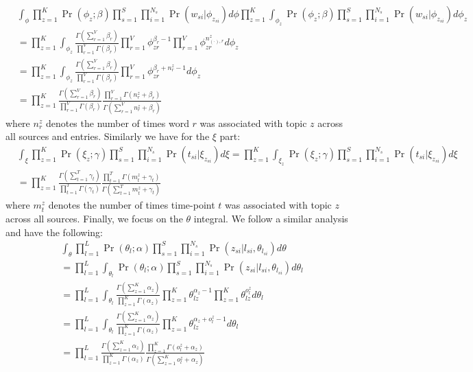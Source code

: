 \documentclass{sig-alternate}
\begin{document}
{\scriptsize
\begin{align}
& \int_{\phi} \prod_{z = 1}^{K}\Pr(\phi_z;\beta) \prod_{s = 1}^{S}\prod_{i = 1}^{N_s}\Pr(w_{si}|\phi_{z_{si}}) d\phi  \prod_{z = 1}^{K} \int_{\phi_{z}} \Pr(\phi_z;\beta) \prod_{s = 1}^{S}\prod_{i = 1}^{N_s}\Pr(w_{si}|\phi_{z_{si}}) d\phi_{z} \nonumber \\
&= \prod_{z = 1}^{K} \int_{\phi_z} \frac{\Gamma(\sum_{r = 1}^V \beta_r)}{\prod_{r = 1}^V \Gamma(\beta_r)}\prod_{r = 1}^V \phi_{zr}^{\beta_r -1} \prod_{r = 1}^V \phi_{zr}^{n^{z}_{(\cdot),r}} d\phi_z \nonumber \\
&= \prod_{z = 1}^{K} \int_{\phi_z} \frac{\Gamma(\sum_{r = 1}^V \beta_r)}{\prod_{r = 1}^V \Gamma(\beta_r)}\prod_{r = 1}^V \phi_{zr}^{\beta_r  + n^{z}_{r} -1} d\phi_z \nonumber \\
& = \prod_{z = 1}^K \frac{\Gamma(\sum_{r = 1}^V \beta_r)}{\prod_{r = 1}^V \Gamma(\beta_r)} \frac{\prod_{r = 1}^V \Gamma(n^{z}_{r} + \beta_r)}{\Gamma(\sum_{r =1}^V n^{z}_{r} + \beta_r)} \nonumber
\end{align}}
where $n^{z}_{r}$ denotes the number of times word $r$ was associated with topic $z$ across all sources and entries. Similarly we have for the $\xi$ part:
{\scriptsize
\begin{align}
&\int_{\xi} \prod_{z = 1}^{K} \Pr(\xi_z;\gamma)\prod_{s = 1}^{S}\prod_{i = 1}^{N_s}\Pr(t_{si}|\xi_{z_{si}}) d\xi = \prod_{z = 1}^K \int_{\xi_z} \Pr(\xi_z;\gamma)\prod_{s = 1}^{S}\prod_{i = 1}^{N_s}\Pr(t_{si}|\xi_{z_{si}}) d\xi \nonumber \\
& = \prod_{z = 1}^K \frac{\Gamma(\sum_{t = 1}^T \gamma_t)}{\prod_{t = 1}^T \Gamma(\gamma_t)} \frac{\prod_{t = 1}^T \Gamma(m^{z}_{t} + \gamma_t)}{\Gamma(\sum_{t =1}^T m^{z}_{t} + \gamma_t)} \nonumber
\end{align}}
where $m^{z}_{t}$ denotes the number of times time-point $t$ was associated with topic $z$ across all sources. Finally, we focus on the $\theta$ integral. We follow a similar analysis and have the following:
{\scriptsize
\begin{align}
&\int_{\theta} \prod_{l = 1}^{L}\Pr(\theta_l;\alpha)\prod_{s = 1}^{S}\prod_{i = 1}^{N_s}\Pr(z_{si}|l_{si},\theta_{l_{si}}) d\theta \nonumber \\
&= \prod_{l = 1}^L \int_{\theta_l} \Pr(\theta_l;\alpha)\prod_{s = 1}^{S}\prod_{i = 1}^{N_s}\Pr(z_{si}|l_{si},\theta_{l_{si}}) d\theta_l \nonumber \\
& = \prod_{l =1}^L\int_{\theta_l} \frac{\Gamma(\sum_{z = 1}^K \alpha_z)}{\prod_{z = 1}^K \Gamma(\alpha_z)}\prod_{z = 1}^K \theta_{lz}^{\alpha_z -1}\prod_{z=1}^K\theta_{lz}^{o^z_{l}}d\theta_l \nonumber \\
&= \prod_{l =1}^L\int_{\theta_l} \frac{\Gamma(\sum_{z = 1}^K \alpha_z)}{\prod_{z = 1}^K \Gamma(\alpha_z)}\prod_{z = 1}^K \theta_{lz}^{\alpha_z  + o^z_{l}-1}d\theta_l \nonumber \\
& = \prod_{l =1}^L\frac{\Gamma(\sum_{z = 1}^K \alpha_z)}{\prod_{z = 1}^K \Gamma(\alpha_z)}\frac{\prod_{z=1}^K\Gamma(o^z_l + \alpha_z)}{\Gamma(\sum_{z = 1}^K o^z_l + \alpha_z)}\nonumber
\end{align}}
\end{document}
